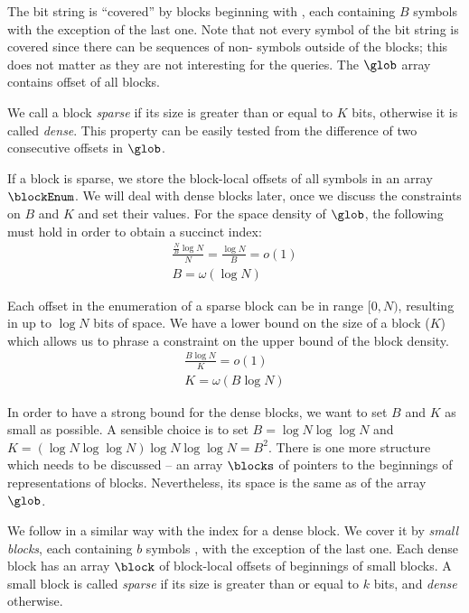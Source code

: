 The bit string is ``covered'' by blocks beginning with \ph{}, each containing $B$ symbols \ph{} with the exception of the last one.
Note that not every symbol of the bit string is covered since there can be sequences of non-\ph{} symbols outside of the blocks; this does not matter as they are not interesting for the queries.
The $\glob$ array contains offset of all blocks.

We call a block \emph{sparse} if its size is greater than or equal to $K$ bits, otherwise it is called \emph{dense}.
This property can be easily tested from the difference of two consecutive offsets in $\glob$.

If a block is sparse, we store the block-local offsets of all symbols \ph{} in an array $\blockEnum$.
We will deal with dense blocks later, once we discuss the constraints on $B$ and $K$ and set their values.
For the space density of $\glob$, the following must hold in order to obtain a succinct index:
\begin{gather*}
\frac{\frac{N}{B} \log N}{N} = \frac{\log N}{B} = o(1) \\
B = \omega(\log N)
\end{gather*}

Each offset in the enumeration of a sparse block can be in range $[0, N)$, resulting in up to $\log N$ bits of space.
We have a lower bound on the size of a block ($K$) which allows us to phrase a constraint on the upper bound of the block density.
\begin{gather*}
\frac{B \log N}{K} = o(1) \\
K = \omega(B \log N)
\end{gather*}

In order to have a strong bound for the dense blocks, we want to set $B$ and $K$ as small as possible.
A sensible choice is to set $B = \log N \log \log N$ and $K = (\log N \log \log N) \log N \log \log N = B^2 $.
There is one more structure which needs to be discussed -- an array $\blocks$ of pointers to the beginnings of representations of blocks.
Nevertheless, its space is the same as of the array $\glob$.

\bigbreak

We follow in a similar way with the index for a dense block.
We cover it by \emph{small blocks}, each containing $b$ symbols \ph{}, with the exception of the last one.
Each dense block has an array $\block$ of block-local offsets of beginnings of small blocks.
A small block is called \emph{sparse} if its size is greater than or equal to $k$ bits, and \emph{dense} otherwise.

